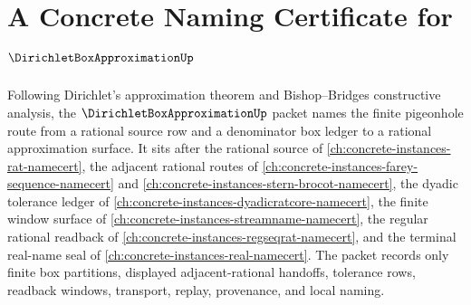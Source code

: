 \chapter{A Concrete Naming Certificate for $\DirichletBoxApproximationUp$}
\label{ch:concrete-instances-dirichlet-box-approximation-namecert}

Following Dirichlet's approximation theorem and Bishop--Bridges constructive analysis, the $\DirichletBoxApproximationUp$ packet names the finite pigeonhole route from a rational source row and a denominator box ledger to a rational approximation surface. It sits after the rational source of \autoref{ch:concrete-instances-rat-namecert}, the adjacent rational routes of \autoref{ch:concrete-instances-farey-sequence-namecert} and \autoref{ch:concrete-instances-stern-brocot-namecert}, the dyadic tolerance ledger of \autoref{ch:concrete-instances-dyadicratcore-namecert}, the finite window surface of \autoref{ch:concrete-instances-streamname-namecert}, the regular rational readback of \autoref{ch:concrete-instances-regseqrat-namecert}, and the terminal real-name seal of \autoref{ch:concrete-instances-real-namecert}. The packet records only finite box partitions, displayed adjacent-rational handoffs, tolerance rows, readback windows, transport, replay, provenance, and local naming.

